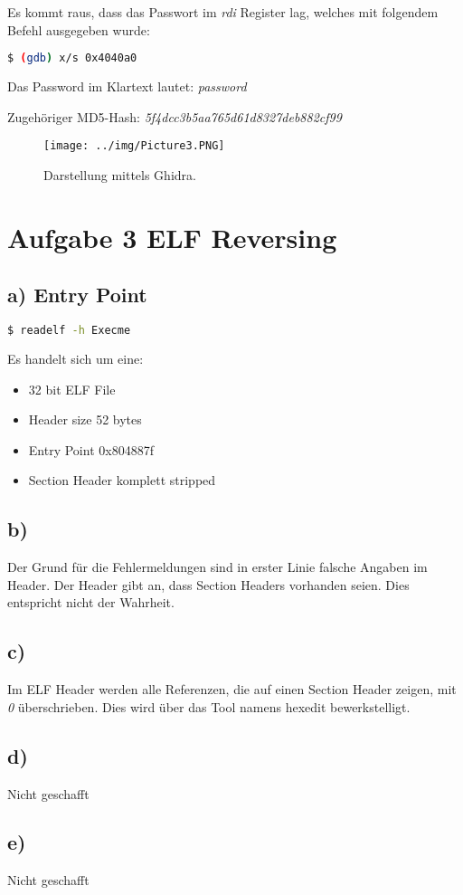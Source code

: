 Es kommt raus, dass das Passwort im \textit{rdi} Register lag, welches mit folgendem Befehl ausgegeben wurde:

\begin{lstlisting}[language=bash]
    $ (gdb) x/s 0x4040a0
\end{lstlisting}

Das Password im Klartext lautet: \textit{password}

Zugehöriger MD5-Hash: \textit{5f4dcc3b5aa765d61d8327deb882cf99}

\begin{figure} [!ht]
\centering
\texttt{[image: ../img/Picture3.PNG]}
\caption{Darstellung mittels Ghidra.}
\end{figure}

\newpage

\section*{Aufgabe 3 ELF Reversing}

\subsection*{a) Entry Point}

\begin{lstlisting}[language=bash]
    $ readelf -h Execme
\end{lstlisting}

Es handelt sich um eine:
\begin{itemize}
    \item 32 bit ELF File
    \item Header size 52 bytes
    \item Entry Point 0x804887f
    \item Section Header komplett stripped
\end{itemize}

\subsection*{b)}

Der Grund für die Fehlermeldungen sind in erster Linie falsche Angaben im Header. Der Header
gibt an, dass Section Headers vorhanden seien. Dies entspricht nicht der Wahrheit.

\subsection*{c)}

Im ELF Header werden alle Referenzen, die auf einen Section Header zeigen, mit \textit{0} überschrieben.
Dies wird über das Tool namens hexedit bewerkstelligt.

\subsection*{d)}

Nicht geschafft

\subsection*{e)}

Nicht geschafft

